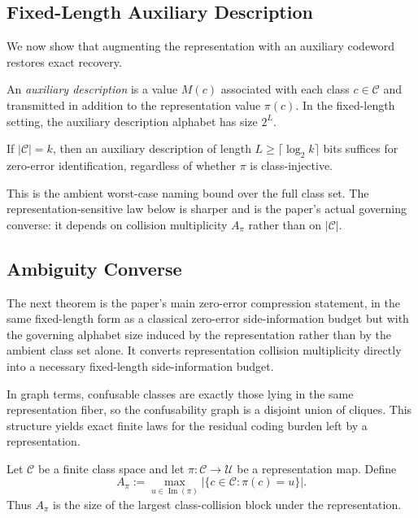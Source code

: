 \subsection{Fixed-Length Auxiliary Description}

We now show that augmenting the representation with an auxiliary codeword restores exact recovery.

\begin{definition}
An \emph{auxiliary description} is a value $M(c)$ associated with each class $c \in \mathcal C$ and transmitted in addition to the representation value $\pi(c)$. In the fixed-length setting, the auxiliary description alphabet has size $2^L$.
\end{definition}

\begin{theorem}\label{thm:tag-restored-sufficiency}
If $|\mathcal C|=k$, then an auxiliary description of length $L \geq \lceil \log_2 k \rceil$ bits suffices for zero-error identification, regardless of whether $\pi$ is class-injective.
\end{theorem}

This is the ambient worst-case naming bound over the full class set. The representation-sensitive law below is sharper and is the paper's actual governing converse: it depends on collision multiplicity $A_\pi$ rather than on $|\mathcal C|$.

\subsection{Ambiguity Converse}

The next theorem is the paper's main zero-error compression statement, in the same fixed-length form as a classical zero-error side-information budget \cite{csiszar2011information} but with the governing alphabet size induced by the representation rather than by the ambient class set alone. It converts representation collision multiplicity directly into a necessary fixed-length side-information budget.

In graph terms, confusable classes are exactly those lying in the same representation fiber, so the confusability graph is a disjoint union of cliques. This structure yields exact finite laws for the residual coding burden left by a representation.

\begin{definition}\label{def:collision-multiplicity}
Let $\mathcal{C}$ be a finite class space and let $\pi : \mathcal{C} \to \mathcal U$ be a representation map. Define
\[
A_\pi := \max_{u \in \operatorname{Im}(\pi)} \left|\{c \in \mathcal{C} : \pi(c)=u\}\right|.
\]
Thus $A_\pi$ is the size of the largest class-collision block under the representation.
\end{definition}

